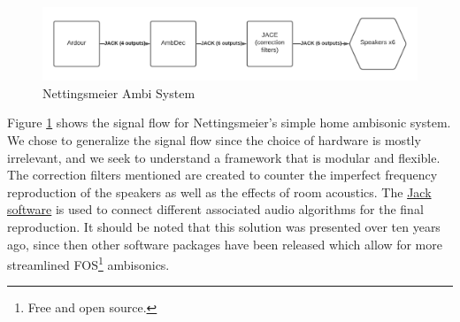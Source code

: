 \begin{figure}[ht]%
\centering
\includegraphics[width=1.0\textwidth]{img/nettingsmeier-extra-frontal.png} 
\caption{Nettingsmeier Ambi System}
\label{fig:extra-frontal}
\end{figure}

Figure \ref{fig:extra-frontal} shows the signal flow for Nettingsmeier's simple home ambisonic system. We chose to generalize the signal flow since the choice of hardware is mostly irrelevant, and we seek to understand a framework that is modular and flexible. The correction filters mentioned are created to counter the imperfect frequency reproduction of the speakers as well as the effects of room acoustics. The \href{https://jackaudio.org/}{Jack software} is used to connect different associated audio algorithms for the final reproduction. It should be noted that this solution was presented over ten years ago, since then other software packages have been released which allow for more streamlined FOS\footnote{Free and open source.} ambisonics. 


